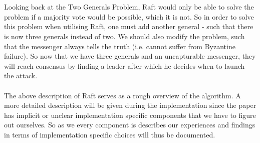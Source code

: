 \\ \\
Looking back at the Two Generals Problem, Raft would only be able to solve the problem if a majority vote would be possible, which it is not. So in order to solve this problem when utilising Raft, one must add another general - such that there is now three generals instead of two. We should also modify the problem, such that the messenger always tells the truth (i.e. cannot suffer from Byzantine failure). So now that we have three generals and an uncapturable messenger, they will reach consensus by finding a leader after which he decides when to launch the attack.
\\ \\
The above description of Raft serves as a rough overview of the algorithm. A more detailed description will be given during the implementation since the paper has implicit or unclear implementation specific components that we have to figure out ourselves. So as we every component is describes our experiences and findings in terms of implementation specific choices will thus be documented.
